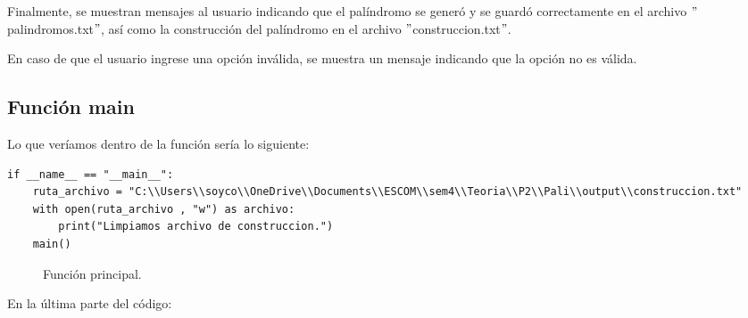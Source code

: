 Finalmente, se muestran mensajes al usuario indicando que el palíndromo se generó y se guardó correctamente en el archivo $"$palindromos.txt$"$, así como la construcción del palíndromo en el archivo $"$construccion.txt$"$.

En caso de que el usuario ingrese una opción inválida, se muestra un mensaje indicando que la opción no es válida.\newline

\newpage
\subsection{Función main}
Lo que veríamos dentro de la función sería lo siguiente:\newline


\begin{lstlisting}
if __name__ == "__main__":
    ruta_archivo = "C:\\Users\\soyco\\OneDrive\\Documents\\ESCOM\\sem4\\Teoria\\P2\\Pali\\output\\construccion.txt"
    with open(ruta_archivo , "w") as archivo:
        print("Limpiamos archivo de construccion.")
    main()

\end{lstlisting}
\begin{figure}[h]
\begin{center}
\end{center}
\caption{Función principal.}
\label{fig:imagen}
\end{figure}


En la última parte del código:\newline

